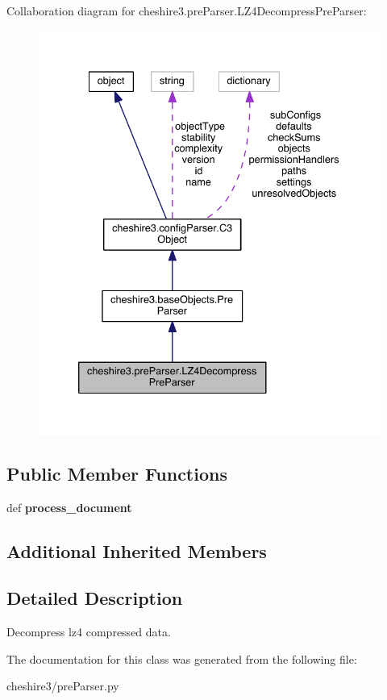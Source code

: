 Collaboration diagram for cheshire3.\-pre\-Parser.\-L\-Z4\-Decompress\-Pre\-Parser\-:
\nopagebreak
\begin{figure}[H]
\begin{center}
\leavevmode
\includegraphics[width=335pt]{classcheshire3_1_1pre_parser_1_1_l_z4_decompress_pre_parser__coll__graph}
\end{center}
\end{figure}
\subsection*{Public Member Functions}
\begin{DoxyCompactItemize}
\item 
\hypertarget{classcheshire3_1_1pre_parser_1_1_l_z4_decompress_pre_parser_af685fb9501213696d96ff5e76cbb10f0}{def {\bfseries process\-\_\-document}}\label{classcheshire3_1_1pre_parser_1_1_l_z4_decompress_pre_parser_af685fb9501213696d96ff5e76cbb10f0}

\end{DoxyCompactItemize}
\subsection*{Additional Inherited Members}


\subsection{Detailed Description}
\begin{DoxyVerb}Decompress lz4 compressed data.\end{DoxyVerb}
 

The documentation for this class was generated from the following file\-:\begin{DoxyCompactItemize}
\item 
cheshire3/pre\-Parser.\-py\end{DoxyCompactItemize}
